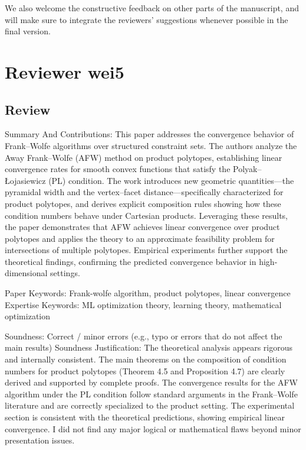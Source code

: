 \documentclass[a4wide]{article}
\begin{document}
We also welcome the constructive feedback on other parts of the manuscript, and will make sure to integrate the reviewers' suggestions whenever possible in the final version.







\section*{Reviewer wei5}

\subsection*{Review}
Summary And Contributions:
This paper addresses the convergence behavior of Frank–Wolfe algorithms over structured constraint sets. The authors analyze the Away Frank–Wolfe (AFW) method on product polytopes, establishing linear convergence rates for smooth convex functions that satisfy the Polyak–Łojasiewicz (PL) condition. The work introduces new geometric quantities—the pyramidal width and the vertex–facet distance—specifically characterized for product polytopes, and derives explicit composition rules showing how these condition numbers behave under Cartesian products. Leveraging these results, the paper demonstrates that AFW achieves linear convergence over product polytopes and applies the theory to an approximate feasibility problem for intersections of multiple polytopes. Empirical experiments further support the theoretical findings, confirming the predicted convergence behavior in high-dimensional settings.

Paper Keywords: Frank-wolfe algorithm, product polytopes, linear convergence
Expertise Keywords: ML optimization theory, learning theory, mathematical optimization

Soundness: Correct / minor errors (e.g., typo or errors that do not affect the main results)
Soundness Justification:
The theoretical analysis appears rigorous and internally consistent. The main theorems on the composition of condition numbers for product polytopes (Theorem 4.5 and Proposition 4.7) are clearly derived and supported by complete proofs. The convergence results for the AFW algorithm under the PL condition follow standard arguments in the Frank–Wolfe literature and are correctly specialized to the product setting. The experimental section is consistent with the theoretical predictions, showing empirical linear convergence. I did not find any major logical or mathematical flaws beyond minor presentation issues.
\end{document}
